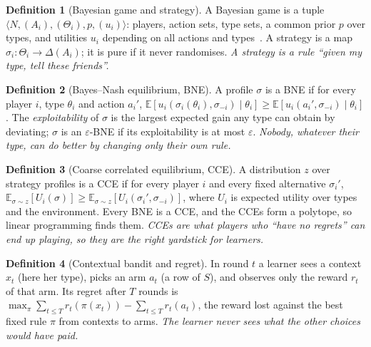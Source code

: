 \documentclass[10pt]{article}
\theoremstyle{plain}
\theoremstyle{definition}\newtheorem{definition}{Definition}
\newcommand{\E}{\mathbb{E}}\newcommand{\1}{\mathbf{1}}
\newcommand{\plain}[1]{\emph{#1}}
\begin{document}
\begin{definition}[Bayesian game and strategy]
A Bayesian game is a tuple $\langle N,(A_i),(\Theta_i),p,(u_i)\rangle$: players, action sets, type sets, a common prior $p$ over types, and
utilities $u_i$ depending on all actions and types~\cite{shoham}. A strategy is a map $\sigma_i:\Theta_i\to\Delta(A_i)$; it is pure if it
never randomises. \plain{A strategy is a rule ``given my type, tell these friends''.}
\end{definition}
\begin{definition}[Bayes--Nash equilibrium, BNE]
A profile $\sigma$ is a BNE if for every player $i$, type $\theta_i$ and action $a_i'$,
$\E[u_i(\sigma_i(\theta_i),\sigma_{-i})\mid\theta_i]\ge \E[u_i(a_i',\sigma_{-i})\mid\theta_i]$.
The \emph{exploitability} of $\sigma$ is the largest expected gain any type can obtain by deviating; $\sigma$ is an $\varepsilon$-BNE if
its exploitability is at most $\varepsilon$. \plain{Nobody, whatever their type, can do better by changing only their own rule.}
\end{definition}
\begin{definition}[Coarse correlated equilibrium, CCE]
A distribution $z$ over strategy profiles is a CCE if for every player $i$ and every fixed alternative $\sigma_i'$,
$\E_{\sigma\sim z}[U_i(\sigma)]\ge\E_{\sigma\sim z}[U_i(\sigma_i',\sigma_{-i})]$, where $U_i$ is expected utility over types and the environment.
Every BNE is a CCE, and the CCEs form a polytope, so linear programming finds them. \plain{CCEs are what players who ``have no
regrets'' can end up playing, so they are the right yardstick for learners.}
\end{definition}
\begin{definition}[Contextual bandit and regret]
In round $t$ a learner sees a context $x_t$ (here her type), picks an arm $a_t$ (a row of $S$), and observes only the reward $r_t$ of
that arm. Its regret after $T$ rounds is $\max_\pi\sum_{t\le T}r_t(\pi(x_t))-\sum_{t\le T}r_t(a_t)$, the reward lost against the best fixed
rule $\pi$ from contexts to arms. \plain{The learner never sees what the other choices would have paid.}
\end{definition}

\end{document}
